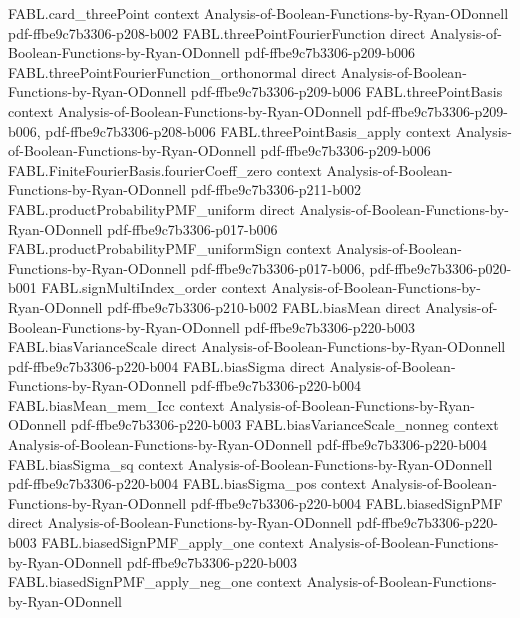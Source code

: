 \begin{theorem}
\proofstep
  {FABL.card_threePoint}
  {context}
  {Analysis-of-Boolean-Functions-by-Ryan-ODonnell}
  {pdf-ffbe9c7b3306-p208-b002}
\proofstep
  {FABL.threePointFourierFunction}
  {direct}
  {Analysis-of-Boolean-Functions-by-Ryan-ODonnell}
  {pdf-ffbe9c7b3306-p209-b006}
\proofstep
  {FABL.threePointFourierFunction_orthonormal}
  {direct}
  {Analysis-of-Boolean-Functions-by-Ryan-ODonnell}
  {pdf-ffbe9c7b3306-p209-b006}
\proofstep
  {FABL.threePointBasis}
  {context}
  {Analysis-of-Boolean-Functions-by-Ryan-ODonnell}
  {pdf-ffbe9c7b3306-p209-b006,
    pdf-ffbe9c7b3306-p208-b006}
\proofstep
  {FABL.threePointBasis_apply}
  {context}
  {Analysis-of-Boolean-Functions-by-Ryan-ODonnell}
  {pdf-ffbe9c7b3306-p209-b006}
\proofstep
  {FABL.FiniteFourierBasis.fourierCoeff_zero}
  {context}
  {Analysis-of-Boolean-Functions-by-Ryan-ODonnell}
  {pdf-ffbe9c7b3306-p211-b002}
\proofstep
  {FABL.productProbabilityPMF_uniform}
  {direct}
  {Analysis-of-Boolean-Functions-by-Ryan-ODonnell}
  {pdf-ffbe9c7b3306-p017-b006}
\proofstep
  {FABL.productProbabilityPMF_uniformSign}
  {context}
  {Analysis-of-Boolean-Functions-by-Ryan-ODonnell}
  {pdf-ffbe9c7b3306-p017-b006,
    pdf-ffbe9c7b3306-p020-b001}
\proofstep
  {FABL.signMultiIndex_order}
  {context}
  {Analysis-of-Boolean-Functions-by-Ryan-ODonnell}
  {pdf-ffbe9c7b3306-p210-b002}
\proofstep
  {FABL.biasMean}
  {direct}
  {Analysis-of-Boolean-Functions-by-Ryan-ODonnell}
  {pdf-ffbe9c7b3306-p220-b003}
\proofstep
  {FABL.biasVarianceScale}
  {direct}
  {Analysis-of-Boolean-Functions-by-Ryan-ODonnell}
  {pdf-ffbe9c7b3306-p220-b004}
\proofstep
  {FABL.biasSigma}
  {direct}
  {Analysis-of-Boolean-Functions-by-Ryan-ODonnell}
  {pdf-ffbe9c7b3306-p220-b004}
\proofstep
  {FABL.biasMean_mem_Icc}
  {context}
  {Analysis-of-Boolean-Functions-by-Ryan-ODonnell}
  {pdf-ffbe9c7b3306-p220-b003}
\proofstep
  {FABL.biasVarianceScale_nonneg}
  {context}
  {Analysis-of-Boolean-Functions-by-Ryan-ODonnell}
  {pdf-ffbe9c7b3306-p220-b004}
\proofstep
  {FABL.biasSigma_sq}
  {context}
  {Analysis-of-Boolean-Functions-by-Ryan-ODonnell}
  {pdf-ffbe9c7b3306-p220-b004}
\proofstep
  {FABL.biasSigma_pos}
  {context}
  {Analysis-of-Boolean-Functions-by-Ryan-ODonnell}
  {pdf-ffbe9c7b3306-p220-b004}
\proofstep
  {FABL.biasedSignPMF}
  {direct}
  {Analysis-of-Boolean-Functions-by-Ryan-ODonnell}
  {pdf-ffbe9c7b3306-p220-b003}
\proofstep
  {FABL.biasedSignPMF_apply_one}
  {context}
  {Analysis-of-Boolean-Functions-by-Ryan-ODonnell}
  {pdf-ffbe9c7b3306-p220-b003}
\proofstep
  {FABL.biasedSignPMF_apply_neg_one}
  {context}
  {Analysis-of-Boolean-Functions-by-Ryan-ODonnell}

\end{theorem}

